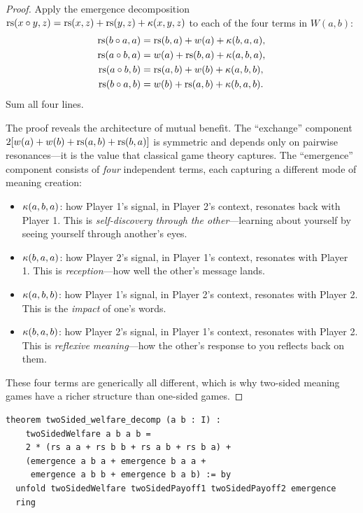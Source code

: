 \begin{proof}
Apply the emergence decomposition $\mathrm{rs}(x \circ y, z) = \mathrm{rs}(x, z) + \mathrm{rs}(y, z)
+ \kappa(x, y, z)$ to each of the four terms in $W(a, b)$:
\begin{align*}
\mathrm{rs}(b \circ a, a) &= \mathrm{rs}(b, a) + w(a) + \kappa(b, a, a), \\
\mathrm{rs}(a \circ b, a) &= w(a) + \mathrm{rs}(b, a) + \kappa(a, b, a), \\
\mathrm{rs}(a \circ b, b) &= \mathrm{rs}(a, b) + w(b) + \kappa(a, b, b), \\
\mathrm{rs}(b \circ a, b) &= w(b) + \mathrm{rs}(a, b) + \kappa(b, a, b).
\end{align*}
Sum all four lines.

The proof reveals the architecture of mutual benefit. The ``exchange''
component $2[w(a) + w(b) + \mathrm{rs}(a,b) + \mathrm{rs}(b,a)]$ is symmetric and
depends only on pairwise resonances---it is the value that classical
game theory captures. The ``emergence'' component consists of
\emph{four} independent terms, each capturing a different mode of
meaning creation:
\begin{itemize}
\item $\kappa(a, b, a)$: how Player 1's signal, in Player 2's context,
resonates back with Player 1. This is \emph{self-discovery through
the other}---learning about yourself by seeing yourself through another's eyes.
\item $\kappa(b, a, a)$: how Player 2's signal, in Player 1's context,
resonates with Player 1. This is \emph{reception}---how well the other's
message lands.
\item $\kappa(a, b, b)$: how Player 1's signal, in Player 2's context,
resonates with Player 2. This is the \emph{impact} of one's words.
\item $\kappa(b, a, b)$: how Player 2's signal, in Player 1's context,
resonates with Player 2. This is \emph{reflexive meaning}---how the
other's response to you reflects back on them.
\end{itemize}
These four terms are generically all different, which is why two-sided
meaning games have a richer structure than one-sided games.
\end{proof}

\begin{lstlisting}[caption={Lean 4: Two-sided welfare emergence decomposition}]
theorem twoSided_welfare_decomp (a b : I) :
    twoSidedWelfare a b a b =
    2 * (rs a a + rs b b + rs a b + rs b a) +
    (emergence a b a + emergence b a a +
     emergence a b b + emergence b a b) := by
  unfold twoSidedWelfare twoSidedPayoff1 twoSidedPayoff2 emergence
  ring
\end{lstlisting}


